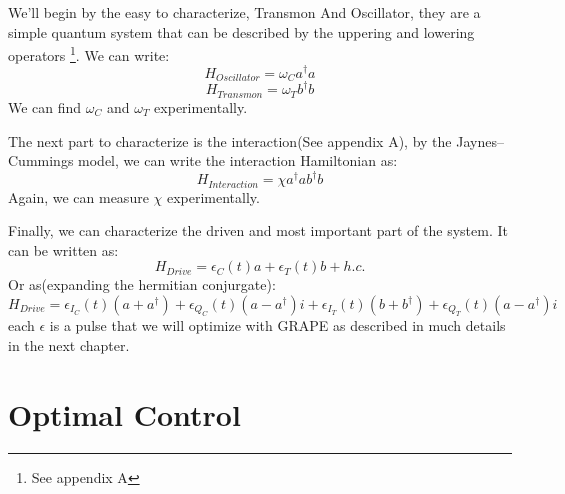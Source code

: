 \documentclass[english, a4paper, 12pt, twoside]{article}
\numberwithin{equation}{section} %
\begin{document}
We'll begin by the easy to characterize, Transmon And Oscillator, they are a simple quantum system that can be described by the uppering and lowering operators \footnote{See appendix A}. We can write:
\begin{equation}
H_{Oscillator} = \omega_C a^\dag{}a
\end{equation}
\begin{equation}
H_{Transmon} = \omega_T b^\dag{}b
\end{equation}
We can find $\omega_C$ and $\omega_T$ experimentally. %
\par
The next part to characterize is the interaction(See appendix A), by the Jaynes–Cummings model, we can write the interaction Hamiltonian as:
\begin{equation}
H_{Interaction} = \chi a^\dag{} a  b^\dag{} b %
\end{equation}
Again, we can measure $\chi$ experimentally.  %
\par
Finally, we can characterize the driven and most important part of the system. It can be written as: %
\begin{equation}
H_{Drive} = \epsilon_C(t)a + \epsilon_T(t)b + h.c.
\end{equation}
Or as(expanding the hermitian conjurgate):
\begin{equation}
H_{Drive} = \epsilon_{I_C}(t)(a + a^\dag{}) + \epsilon_{Q_C}(t)(a - a^\dag{})i + \epsilon_{I_T}(t)(b + b^\dag{})+ \epsilon_{Q_T}(t)(a - a^\dag{})i
\end{equation}
each \(\epsilon\) is a pulse that we will optimize with GRAPE as described in much details in the next chapter.

\newpage
\section{Optimal Control}
\end{document}
